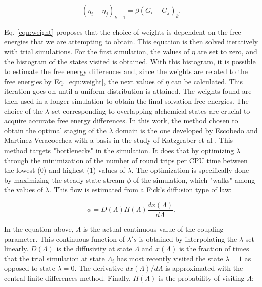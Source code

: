 \documentclass[final,12p,times,twocolumn]{elsarticle}
\begin{document}
	\begin{equation}
	\label{eqn:weight}
	(\eta_{i} - \eta_{j})_{k+1} = \beta(G_i-G_j)_{k} .
	\end{equation}
	
	Eq. \ref{eqn:weight} proposes that the choice of weights is dependent on the free energies that we are attempting to obtain. This equation is then solved iteratively with trial simulations. For the first simulation, the values of $\eta$ are set to zero, and the histogram of the states visited is obtained. With this histogram, it is possible to estimate the free energy differences and, since the weights are related to the free energies by Eq. \ref{eqn:weight}, the next values of $\eta$ can be calculated. This iteration goes on until a uniform distribution is attained. The weights found are then used in a longer simulation to obtain the final solvation free energies. The choice of the $\lambda$ set corresponding to overlapping alchemical states are crucial to acquire accurate free energy differences. In this work, the method chosen to obtain the optimal staging of the $\lambda$ domain is the one developed by Escobedo and Martinez-Veracoechea  \cite{escobedo2007} with a basis in the study of  Katzgraber et al \cite{1742-5468-2006-03-P03018}. This method targets "bottlenecks" in the simulation. It does that by optimizing $\lambda$ through the minimization of the number of round trips per CPU time between the lowest ($0$) and highest ($1$) values of $\lambda$. The optimization is specifically done by maximizing the steady-state stream $\phi$ of the simulation, which "walks" among the values of $\lambda$. This flow is estimated from a Fick's diffusion type of law:
	
	\begin{equation}
	\phi = D(\Lambda) \Pi (\Lambda) \dfrac{dx(\Lambda)}{d \Lambda}.
	\label{eqn:stream}
	\end{equation}
	
	In the equation above, $\Lambda$ is the actual continuous value of the coupling parameter. This continuous function of $\lambda 's$ is obtained by interpolating the $\lambda$ set linearly. $D(\Lambda)$ is the diffusivity at  state $\Lambda$ and $x(\Lambda)$ is the fraction of times that the trial simulation at state $\Lambda_{i}$ has most recently visited the state $\lambda=1$ as opposed to state $\lambda=0$. The derivative ${dx(\Lambda)}/{d \Lambda}$ is approximated with the central finite differences method. Finally, $\Pi (\Lambda)$ is the probability of visiting $\Lambda$:
\end{document}
